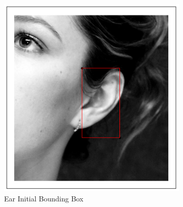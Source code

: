 \begin{figure}[h!]
    \centering
    \begin{subfigure}[b]{0.1\textwidth}
            \includegraphics[width=\textwidth]{supports/Segmentation_Measure/ear}
        \caption{Ear Initial Bounding Box}
    \end{subfigure}
    \qquad
    \begin{subfigure}[b]{0.1\textwidth}

\end{subfigure}
\end{figure}
